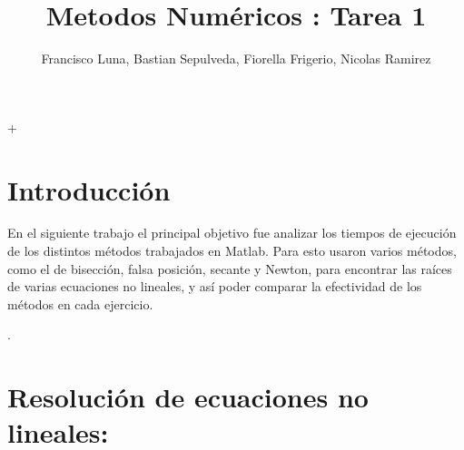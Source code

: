 +\documentclass{udpreport}
\title{Metodos Numéricos : Tarea 1}
\author{Francisco Luna, Bastian Sepulveda, Fiorella Frigerio, Nicolas Ramirez }
\begin{document}
\maketitle
\tableofcontents


\chapter{Introducción}

En el siguiente trabajo el principal objetivo fue analizar los tiempos de ejecución de los distintos métodos trabajados en Matlab. Para esto usaron varios métodos, como el de bisección, falsa posición, secante y Newton,  para encontrar las raíces de varias ecuaciones no lineales, y así poder comparar la efectividad de los métodos en cada ejercicio.

.
\chapter{Resolución de ecuaciones no lineales:}
\end{document}

